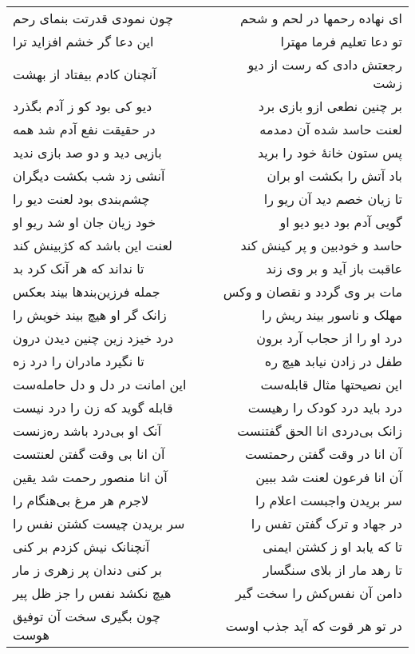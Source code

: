 \begin{center}
\begin{longtable}{l p{0.5cm} r}
\\
چون نمودی قدرتت بنمای رحم
&&
ای نهاده رحمها در لحم و شحم
\\
این دعا گر خشم افزاید ترا
&&
تو دعا تعلیم فرما مهترا
\\
آنچنان کادم بیفتاد از بهشت
&&
رجعتش دادی که رست از دیو زشت
\\
دیو کی بود کو ز آدم بگذرد
&&
بر چنین نطعی ازو بازی برد
\\
در حقیقت نفع آدم شد همه
&&
لعنت حاسد شده آن دمدمه
\\
بازیی دید و دو صد بازی ندید
&&
پس ستون خانهٔ خود را برید
\\
آنشی زد شب بکشت دیگران
&&
باد آتش را بکشت او بران
\\
چشم‌بندی بود لعنت دیو را
&&
تا زیان خصم دید آن ریو را
\\
خود زیان جان او شد ریو او
&&
گویی آدم بود دیو دیو او
\\
لعنت این باشد که کژبینش کند
&&
حاسد و خودبین و پر کینش کند
\\
تا نداند که هر آنک کرد بد
&&
عاقبت باز آید و بر وی زند
\\
جمله فرزین‌بندها بیند بعکس
&&
مات بر وی گردد و نقصان و وکس
\\
زانک گر او هیچ بیند خویش را
&&
مهلک و ناسور بیند ریش را
\\
درد خیزد زین چنین دیدن درون
&&
درد او را از حجاب آرد برون
\\
تا نگیرد مادران را درد زه
&&
طفل در زادن نیابد هیچ ره
\\
این امانت در دل و دل حامله‌ست
&&
این نصیحتها مثال قابله‌ست
\\
قابله گوید که زن را درد نیست
&&
درد باید درد کودک را رهیست
\\
آنک او بی‌درد باشد ره‌زنست
&&
زانک بی‌دردی انا الحق گفتنست
\\
آن انا بی وقت گفتن لعنتست
&&
آن انا در وقت گفتن رحمتست
\\
آن انا منصور رحمت شد یقین
&&
آن انا فرعون لعنت شد ببین
\\
لاجرم هر مرغ بی‌هنگام را
&&
سر بریدن واجبست اعلام را
\\
سر بریدن چیست کشتن نفس را
&&
در جهاد و ترک گفتن تفس را
\\
آنچنانک نیش کزدم بر کنی
&&
تا که یابد او ز کشتن ایمنی
\\
بر کنی دندان پر زهری ز مار
&&
تا رهد مار از بلای سنگسار
\\
هیچ نکشد نفس را جز ظل پیر
&&
دامن آن نفس‌کش را سخت گیر
\\
چون بگیری سخت آن توفیق هوست
&&
در تو هر قوت که آید جذب اوست
\\

\end{longtable}
\end{center}
